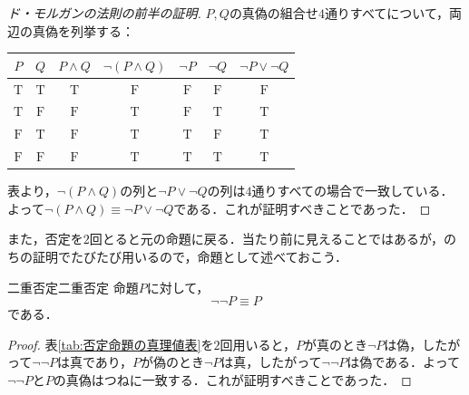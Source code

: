 \begin{tleftbar}
  \begin{proof}[ド・モルガンの法則の前半の証明]
    $P,Q$の真偽の組合せ$4$通りすべてについて，両辺の真偽を列挙する：
    \begin{center}
      \begin{tabular}{|c|c||c|c||c|c|c|} \hline
        $P$          & $Q$          & $P \land Q$  & $\lnot (P \land Q)$ & $\lnot P$    & $\lnot Q$    & $\lnot P \lor \lnot Q$ \\ \hline
        $\mathrm{T}$ & $\mathrm{T}$ & $\mathrm{T}$ & $\mathrm{F}$        & $\mathrm{F}$ & $\mathrm{F}$ & $\mathrm{F}$           \\ \hline
        $\mathrm{T}$ & $\mathrm{F}$ & $\mathrm{F}$ & $\mathrm{T}$        & $\mathrm{F}$ & $\mathrm{T}$ & $\mathrm{T}$           \\ \hline
        $\mathrm{F}$ & $\mathrm{T}$ & $\mathrm{F}$ & $\mathrm{T}$        & $\mathrm{T}$ & $\mathrm{F}$ & $\mathrm{T}$           \\ \hline
        $\mathrm{F}$ & $\mathrm{F}$ & $\mathrm{F}$ & $\mathrm{T}$        & $\mathrm{T}$ & $\mathrm{T}$ & $\mathrm{T}$           \\ \hline
      \end{tabular}
    \end{center}
    表より，$\lnot (P \land Q)$の列と$\lnot P \lor \lnot Q$の列は$4$通りすべての場合で一致している．よって$\lnot (P \land Q) \equiv \lnot P \lor \lnot Q$である．これが証明すべきことであった．
  \end{proof}
\end{tleftbar}

また，否定を$2$回とると元の命題に戻る．当たり前に見えることではあるが，のちの証明でたびたび用いるので，命題として述べておこう．

\begin{prop}{二重否定}{二重否定}
  命題$P$に対して，
  \[
    \lnot \lnot P \equiv P
  \]
  である．
\end{prop}

\begin{tleftbar}
  \begin{proof}
    表\ref{tab:否定命題の真理値表}を$2$回用いると，$P$が真のとき$\lnot P$は偽，したがって$\lnot \lnot P$は真であり，$P$が偽のとき$\lnot P$は真，したがって$\lnot \lnot P$は偽である．よって$\lnot \lnot P$と$P$の真偽はつねに一致する．これが証明すべきことであった．
  \end{proof}
\end{tleftbar}

